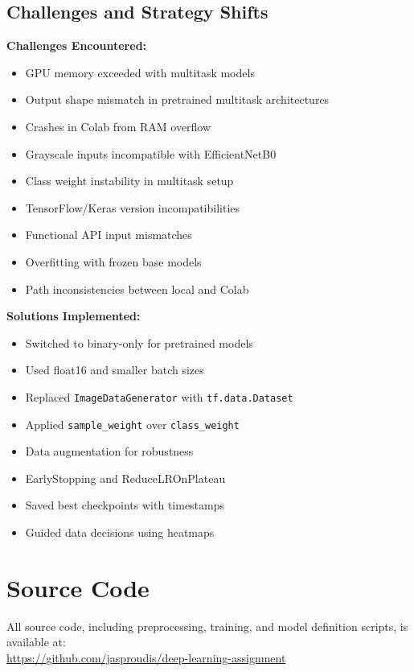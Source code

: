 \documentclass[11pt]{article}
\begin{document}
\subsection*{Challenges and Strategy Shifts}

\textbf{Challenges Encountered:}
\begin{itemize}
    \item GPU memory exceeded with multitask models
    \item Output shape mismatch in pretrained multitask architectures
    \item Crashes in Colab from RAM overflow
    \item Grayscale inputs incompatible with EfficientNetB0
    \item Class weight instability in multitask setup
    \item TensorFlow/Keras version incompatibilities
    \item Functional API input mismatches
    \item Overfitting with frozen base models
    \item Path inconsistencies between local and Colab
\end{itemize}

\textbf{Solutions Implemented:}
\begin{itemize}
    \item Switched to binary-only for pretrained models
    \item Used float16 and smaller batch sizes
    \item Replaced \texttt{ImageDataGenerator} with \texttt{tf.data.Dataset}
    \item Applied \texttt{sample\_weight} over \texttt{class\_weight}
    \item Data augmentation for robustness
    \item EarlyStopping and ReduceLROnPlateau
    \item Saved best checkpoints with timestamps
    \item Guided data decisions using heatmaps
\end{itemize}

\section*{Source Code}
All source code, including preprocessing, training, and model definition scripts, is available at: \\
\url{https://github.com/jasproudis/deep-learning-assignment}
\end{document}
